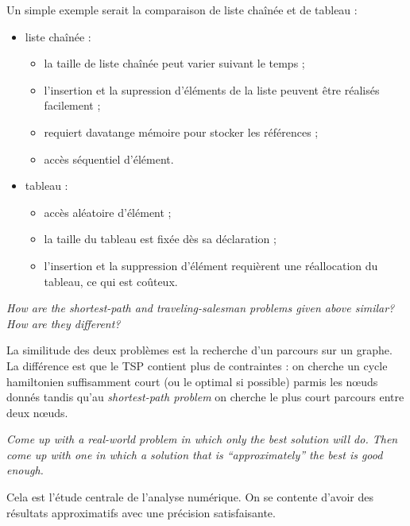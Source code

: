 \begin{description}
    \begin{ex}
        Un simple exemple serait la comparaison de liste cha\^in\'ee et de tableau :
        \begin{itemize}
          \item liste cha\^in\'ee :
            \begin{itemize}
              \item[\cmark] la taille de liste cha\^in\'ee peut varier suivant le temps ;
              \item[\cmark] l'insertion et la supression d'\'el\'ements de la liste peuvent \^etre r\'ealis\'es facilement ;
              \item[\xmark] requiert davatange m\'emoire pour stocker les r\'ef\'erences ;
              \item[\xmark] acc\`es s\'equentiel d'\'el\'ement.
            \end{itemize}
          \item tableau :
            \begin{itemize}
              \item[\cmark] acc\`es al\'eatoire d'\'el\'ement ;
              \item[\xmark] la taille du tableau est fix\'ee d\`es sa d\'eclaration ;
              \item[\xmark] l'insertion et la suppression d'\'el\'ement requi\`erent une r\'eallocation du tableau, ce qui est co\^uteux.
            \end{itemize}
        \end{itemize}
    \end{ex}

   {\itshape How are the shortest-path and traveling-salesman problems given above similar? How are they different?}

    \begin{ex}
      La similitude des deux probl\`emes est la recherche d'un parcours sur un graphe. La diff\'erence est que le TSP contient plus       de contraintes : on cherche un cycle hamiltonien suffisamment court (ou le optimal si possible) parmis les n\oe uds donn\'es tandis qu'au {\it shortest-path problem} on cherche le plus court parcours entre deux n\oe uds. \mbox{}
    \end{ex}

   {\itshape Come up with a real-world problem in which only the best solution will do. Then come up with one in which a solution that is “approximately” the best is good enough.}

    \begin{ex}
      Cela est l'\'etude centrale de l'analyse num\'erique. On se contente d'avoir des r\'esultats approximatifs avec une pr\'ecision satisfaisante.
    \end{ex}

\end{description}

